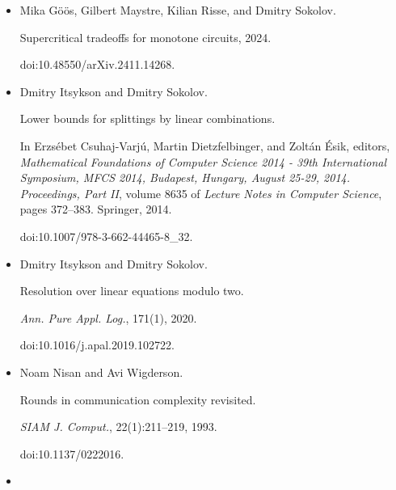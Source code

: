 \documentclass[10pt,a4paper]{article}
\begin{document}
\begin{itemize}
\emph{Theory Comput.}, 16:1–30, 2020.


Preliminary version in STOC 2018.


doi:10.4086/TOC.2020.V016A013.





\item[] 
[18]

Mika Göös, Gilbert Maystre, Kilian Risse, and Dmitry Sokolov.


Supercritical tradeoffs for monotone circuits, 2024.


doi:10.48550/arXiv.2411.14268.





\item[] 
[19]

Dmitry Itsykson and Dmitry Sokolov.


Lower bounds for splittings by linear combinations.


In Erzsébet Csuhaj-Varjú, Martin Dietzfelbinger, and
Zoltán Ésik, editors, \emph{Mathematical Foundations of Computer
Science 2014 - 39th International Symposium, MFCS 2014, Budapest, Hungary,
August 25-29, 2014. Proceedings, Part II}, volume 8635 of \emph{Lecture
Notes in Computer Science}, pages 372–383. Springer, 2014.


doi:10.1007/978-3-662-44465-8\_32.





\item[] 
[20]

Dmitry Itsykson and Dmitry Sokolov.


Resolution over linear equations modulo two.


\emph{Ann. Pure Appl. Log.}, 171(1), 2020.


doi:10.1016/j.apal.2019.102722.





\item[] 
[21]

Noam Nisan and Avi Wigderson.


Rounds in communication complexity revisited.


\emph{SIAM J. Comput.}, 22(1):211–219, 1993.


doi:10.1137/0222016.





\item[] 
[22]


\end{itemize}
\end{document}
